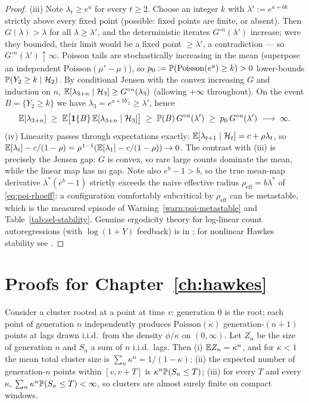 \begin{proof}
(iii) Note $\lambda_t \ge e^a$ for every $t \ge 2$. Choose an integer $k$ with $\lambda' := e^{a +
bk}$ strictly above every fixed point (possible: fixed points are finite, or absent). Then
$G(\lambda) > \lambda$ for all $\lambda \ge \lambda'$, and the deterministic iterates $G^{\circ
n}(\lambda')$ increase; were they bounded, their limit would be a fixed point $\ge \lambda'$, a
contradiction --- so $G^{\circ n}(\lambda') \uparrow \infty$. Poisson tails are stochastically
increasing in the mean (superpose an independent $\mathrm{Poisson}(\mu' - \mu)$), so $p_0 :=
\mathbb{P}(\mathrm{Poisson}(e^a) \ge k) > 0$ lower-bounds $\mathbb{P}(Y_2 \ge k \mid \mathcal{H}_2)$. By conditional
Jensen with the convex increasing $G$ and induction on $n$, $\mathbb{E}[\lambda_{3+n} \mid \mathcal{H}_3] \ge
G^{\circ n}(\lambda_3)$ (allowing $+\infty$ throughout). On the event $B = \{Y_2 \ge k\}$ we have
$\lambda_3 = e^{a + bY_2} \ge \lambda'$, hence
\[
\mathbb{E}[\lambda_{3+n}] \;\ge\; \mathbb{E}\big[\mathbf{1}\{B\}\, \mathbb{E}[\lambda_{3+n} \mid \mathcal{H}_3]\big]
\;\ge\; \mathbb{P}(B)\, G^{\circ n}(\lambda') \;\ge\; p_0\, G^{\circ n}(\lambda')
\;\longrightarrow\; \infty .
\]
(iv) Linearity passes through expectations exactly: $\mathbb{E}[\lambda_{t+1} \mid \mathcal{H}_t] = c + \rho
\lambda_t$, so $\mathbb{E}[\lambda_t] - c/(1-\rho) = \rho^{\,t-1}(\mathbb{E}[\lambda_1] - c/(1-\rho)) \to 0$. The
contrast with (iii) is precisely the Jensen gap: $G$ is convex, so rare large counts dominate the
mean, while the linear map has no gap. Note also $e^b - 1 > b$, so the true mean-map derivative
$\lambda^*(e^b - 1)$ strictly exceeds the naive effective radius $\rho_{\mathrm{eff}} = b\lambda^*$
of \eqref{eq:poi-rhoeff}: a configuration comfortably subcritical by $\rho_{\mathrm{eff}}$ can be
metastable, which is the measured episode of Warning~\ref{warn:poi-metastable} and
Table~\ref{tab:sel-stability}. Genuine ergodicity theory for log-linear count autoregressions (with
$\log(1+Y)$ feedback) is in \cite{fokianos2009}; for nonlinear Hawkes stability see
\cite{bremaud1996}.
\end{proof}

\section{Proofs for Chapter~\ref{ch:hawkes}}
\label{app:proofs-ch8}

\begin{lemma}
\label{lem:app-branching}
Consider a cluster rooted at a point at time $v$: generation $0$ is the root; each point of
generation $n$ independently produces $\mathrm{Poisson}(\kappa)$ generation-$(n{+}1)$ points at lags
drawn i.i.d.\ from the density $\phi/\kappa$ on $(0,\infty)$. Let $Z_n$ be the size of generation
$n$ and $S_n$ a sum of $n$ i.i.d.\ lags. Then (i) $\mathbb{E} Z_n = \kappa^n$, and for $\kappa < 1$ the mean
total cluster size is $\sum_n \kappa^n = 1/(1-\kappa)$; (ii) the expected number of generation-$n$
points within $[v, v+T]$ is $\kappa^n \mathbb{P}(S_n \le T)$; (iii) for every $T$ and every $\kappa$,
$\sum_n \kappa^n \mathbb{P}(S_n \le T) < \infty$, so clusters are almost surely finite on compact
windows.
\end{lemma}

